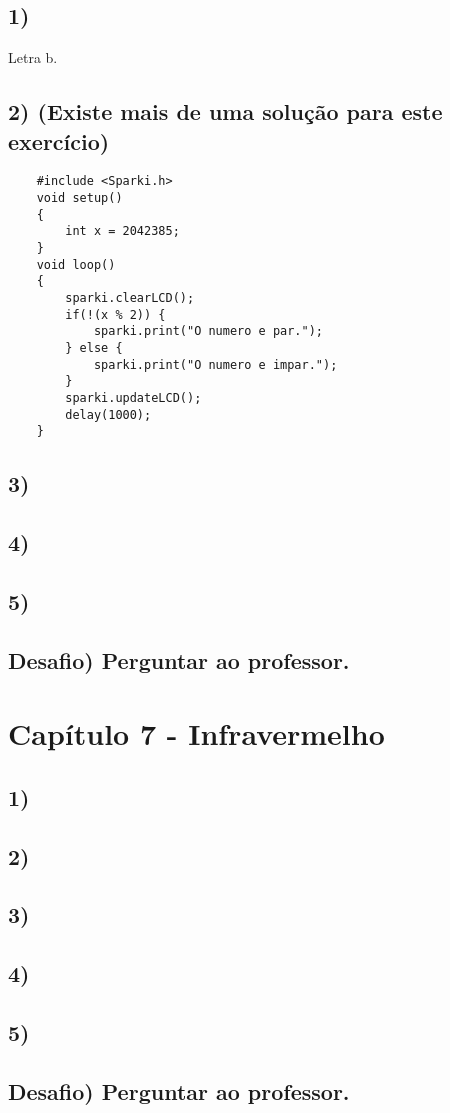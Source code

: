     \subsection*{1)} Letra b.
    
    \subsection*{2) (Existe mais de uma solução para este exercício)}
    
    \begin{verbatim}
    #include <Sparki.h>
    void setup()
    {
        int x = 2042385;
    }
    void loop()
    {
        sparki.clearLCD();
        if(!(x % 2)) {
            sparki.print("O numero e par.");
        } else {
            sparki.print("O numero e impar.");
        }
        sparki.updateLCD();
        delay(1000);
    }
    \end{verbatim}
    
    \subsection*{3)}
    
    \subsection*{4)}
    
    \subsection*{5)}
    
    \subsection*{Desafio) Perguntar ao professor.}

\section*{Capítulo 7 - Infravermelho}

    \subsection*{1)}
    
    \subsection*{2)}
    
    \subsection*{3)}
    
    \subsection*{4)}
    
    \subsection*{5)}
    
    \subsection*{Desafio) Perguntar ao professor.}
    